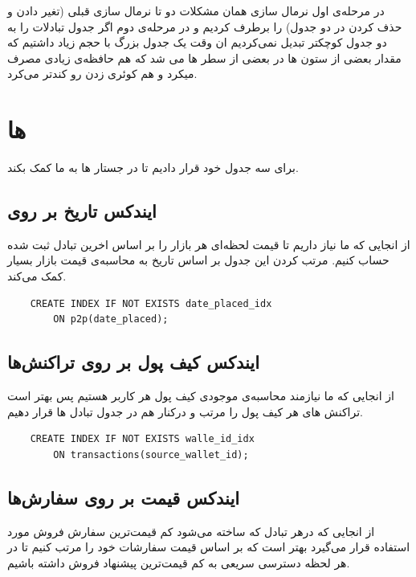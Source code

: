 \documentclass{book}
\begin{document}
{\large{}} در مرحله‌ی اول نرمال سازی همان مشکلات دو تا نرمال سازی قبلی (تغیر دادن و حذف کردن در دو جدول) را برطرف کردیم و در مرحله‌ی دوم اگر جدول تبادلات را به دو جدول کوچکتر تبدیل نمی‌کردیم ان وقت یک جدول بزرگ با حجم زیاد داشتیم که مقدار بعضی از ستون ها در بعضی از سطر ها  می شد که هم حافظه‌ی زیادی مصرف میکرد و هم کوئری زدن رو کند‌تر می‌کرد.

\section{ها}
برای سه جدول خود  قرار دادیم تا در جستار ها به ما کمک بکند.
\subsection{ایندکس تاریخ بر روی }
از انجایی که ما نیاز داریم تا قیمت لحظه‌ای هر بازار را بر اساس اخرین تبادل ثبت شده حساب کنیم. مرتب کردن این جدول بر اساس تاریخ به محاسبه‌ی قیمت بازار بسیار کمک می‌کند.

\begin{latin}
    \begin{verbatim}
    CREATE INDEX IF NOT EXISTS date_placed_idx 
        ON p2p(date_placed);
    \end{verbatim}
\end{latin}


\subsection{ایندکس کیف پول بر روی تراکنش‌ها}
از انجایی که ما نیازمند محاسبه‌ی موجودی کیف پول هر کاربر هستیم پس بهتر است تراکنش های هر کیف پول را مرتب و درکنار هم در جدول تبادل ها قرار دهیم.

\begin{latin}
    \begin{verbatim}
    CREATE INDEX IF NOT EXISTS walle_id_idx 
        ON transactions(source_wallet_id);
    \end{verbatim}
\end{latin}

\subsection{ایندکس قیمت بر روی سفارش‌ها}
از انجایی که درهر تبادل که ساخته می‌شود کم قیمت‌ترین سفارش فروش مورد استفاده قرار می‌گیرد بهتر است که بر اساس قیمت سفارشات خود را مرتب کنیم تا در هر لحظه دسترسی سریعی به کم قیمت‌ترین پیشنهاد فروش داشته باشیم.
\end{document}
